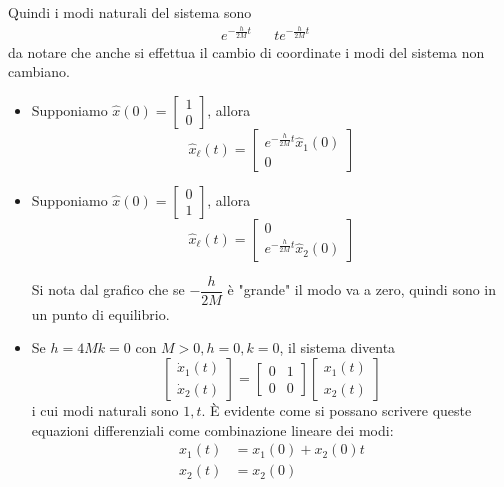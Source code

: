 \documentclass{article}
\begin{document}
Quindi i modi naturali del sistema sono
\begin{align*}
    &e^{- \frac{h}{2M}t} & &t e^{- \frac{h}{2M}t}  
\end{align*}
da notare che anche si effettua il cambio di coordinate i modi del sistema non cambiano.
\begin{itemize}
    \item Supponiamo $\hat x(0) = \begin{bmatrix} 1\\0 \end{bmatrix}$, allora
    \[
        \hat x_\ell (t) = 
        \begin{bmatrix}
            e^{- \frac{h}{2M}t} \hat x_1(0)\\0
        \end{bmatrix}
    \]
    \item Supponiamo $\hat x(0) = \begin{bmatrix} 0\\1 \end{bmatrix}$, allora
    \[
        \hat x_\ell (t) = 
        \begin{bmatrix}
            0\\e^{- \frac{h}{2M}t} \hat x_2(0)
        \end{bmatrix}
    \]
    \begin{center}
    \end{center}
    Si nota dal grafico che se $- \dfrac{h}{2M}$ è "grande" il modo va a zero, quindi sono in un punto di equilibrio.
    \item Se $h = 4Mk = 0$ con $M >0,h=0,k=0$, il sistema diventa
    \[
        \begin{bmatrix}
            \dot x_1(t)\\
            \dot x_2(t)
        \end{bmatrix} =
        \begin{bmatrix}
            0 & 1\\
            0 & 0
        \end{bmatrix}
        \begin{bmatrix}
            x_1(t)\\
            x_2(t)
        \end{bmatrix}
    \]
    i cui modi naturali sono $1,t$. È evidente come si possano scrivere queste equazioni differenziali come combinazione lineare dei modi:
    \begin{align*}
        x_1(t) &= x_1(0) + x_2(0)t\\
        x_2(t) &= x_2(0) 
    \end{align*}
\end{itemize}
\end{document}
